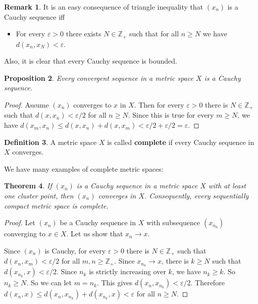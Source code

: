 \documentclass[12pt,b5paper,notitlepage]{article}
\theoremstyle{definition}
\newtheorem{df}{Definition}[section]
\newtheorem{rem}[df]{Remark}
\theoremstyle{plain}
\newtheorem{thm}[df]{Theorem}
\newtheorem{pp}[df]{Proposition}
\newcommand{\Zbb}{\mathbb Z}
\newcommand{\eps}{\varepsilon}
\numberwithin{equation}{section}
\begin{document}
\begin{rem}
It is an easy consequence of triangle inequality that $(x_n)$ is a Cauchy sequence iff
\begin{itemize}
\item For every $\eps>0$ there exists $N\in\Zbb_+$ such that for all $n\geq N$ we have $d(x_n,x_N)<\eps$.
\end{itemize}
Also, it is clear that every Cauchy sequence is bounded.
\end{rem}


\begin{pp}\label{lb83}
Every convergent sequence in a metric space $X$ is a Cauchy sequence.
\end{pp}

\begin{proof}
Assume $(x_n)$ converges to $x$ in $X$. Then for every $\eps>0$ there is $N\in\Zbb_+$ such that $d(x,x_n)<\eps/2$ for all $n\geq N$. Since this is true for every $m\geq N$, we have $d(x_m,x_n)\leq d(x,x_n)+d(x,x_m)<\eps/2+\eps/2=\eps$.
\end{proof}


\begin{df}
A metric space $X$ is called \textbf{complete}  if every Cauchy sequence in $X$ converges.
\end{df}




We have many examples of complete metric spaces:

\begin{thm}\label{lb79}
If $(x_n)$ is a Cauchy sequence in a metric space $X$ with at least one cluster point, then $(x_n)$ converges in $X$. Consequently, every sequentially compact metric space is complete.
\end{thm}

\begin{proof}
Let $(x_n)$ be a Cauchy sequence in $X$ with subsequence $(x_{n_k})$ converging to $x\in X$. Let us show that $x_n\rightarrow x$. 

Since $(x_n)$ is Cauchy, for every $\eps>0$ there is $N\in\Zbb_+$ such that $d(x_n,x_m)<\eps/2$ for all $m,n\geq \Zbb_+$. Since $x_{n_k}\rightarrow x$, there is $k\geq N$ such that $d(x_{n_k},x)<\eps/2$. Since $n_k$ is strictly increasing over $k$, we have $n_k\geq k$. So $n_k\geq N$. So we can let $m=n_k$. This gives $d(x_n,x_{n_k})<\eps/2$. Therefore $d(x_n,x)\leq d(x_n,x_{n_k})+d(x_{n_k},x)<\eps$ for all $n\geq N$.
\end{proof}
\end{document}
